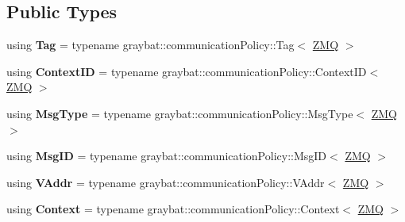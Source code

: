 \subsection*{Public Types}
\begin{DoxyCompactItemize}
\item 
\hypertarget{structgraybat_1_1communicationPolicy_1_1ZMQ_a70c989500cb46ab5b71768fae699759f}{}using {\bfseries Tag} = typename graybat\+::communication\+Policy\+::\+Tag$<$ \hyperlink{structgraybat_1_1communicationPolicy_1_1ZMQ}{Z\+M\+Q} $>$\label{structgraybat_1_1communicationPolicy_1_1ZMQ_a70c989500cb46ab5b71768fae699759f}

\item 
\hypertarget{structgraybat_1_1communicationPolicy_1_1ZMQ_af14a2e927b90f85e30e2eafe2fb86347}{}using {\bfseries Context\+I\+D} = typename graybat\+::communication\+Policy\+::\+Context\+I\+D$<$ \hyperlink{structgraybat_1_1communicationPolicy_1_1ZMQ}{Z\+M\+Q} $>$\label{structgraybat_1_1communicationPolicy_1_1ZMQ_af14a2e927b90f85e30e2eafe2fb86347}

\item 
\hypertarget{structgraybat_1_1communicationPolicy_1_1ZMQ_ac227f7b180d8eaee5d493b09917e10e7}{}using {\bfseries Msg\+Type} = typename graybat\+::communication\+Policy\+::\+Msg\+Type$<$ \hyperlink{structgraybat_1_1communicationPolicy_1_1ZMQ}{Z\+M\+Q} $>$\label{structgraybat_1_1communicationPolicy_1_1ZMQ_ac227f7b180d8eaee5d493b09917e10e7}

\item 
\hypertarget{structgraybat_1_1communicationPolicy_1_1ZMQ_a073da259521988b9e3ecacfc8db18029}{}using {\bfseries Msg\+I\+D} = typename graybat\+::communication\+Policy\+::\+Msg\+I\+D$<$ \hyperlink{structgraybat_1_1communicationPolicy_1_1ZMQ}{Z\+M\+Q} $>$\label{structgraybat_1_1communicationPolicy_1_1ZMQ_a073da259521988b9e3ecacfc8db18029}

\item 
\hypertarget{structgraybat_1_1communicationPolicy_1_1ZMQ_a6a60449eee02f72a8b6998dcd8eacb83}{}using {\bfseries V\+Addr} = typename graybat\+::communication\+Policy\+::\+V\+Addr$<$ \hyperlink{structgraybat_1_1communicationPolicy_1_1ZMQ}{Z\+M\+Q} $>$\label{structgraybat_1_1communicationPolicy_1_1ZMQ_a6a60449eee02f72a8b6998dcd8eacb83}

\item 
\hypertarget{structgraybat_1_1communicationPolicy_1_1ZMQ_a1675812d40f395451e11cabfd5fb28e1}{}using {\bfseries Context} = typename graybat\+::communication\+Policy\+::\+Context$<$ \hyperlink{structgraybat_1_1communicationPolicy_1_1ZMQ}{Z\+M\+Q} $>$\label{structgraybat_1_1communicationPolicy_1_1ZMQ_a1675812d40f395451e11cabfd5fb28e1}


\end{DoxyCompactItemize}
